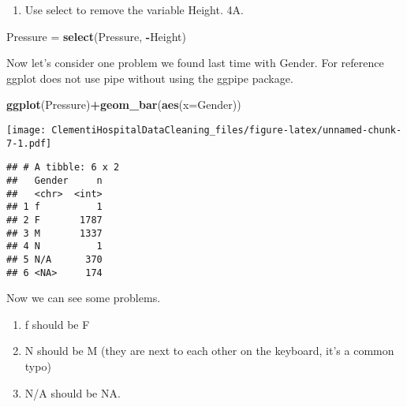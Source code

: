 \documentclass[
]{article}
\newenvironment{Shaded}{\begin{snugshade}}{\end{snugshade}}
\newcommand{\DataTypeTok}[1]{\textcolor[rgb]{0.13,0.29,0.53}{#1}}
\newcommand{\KeywordTok}[1]{\textcolor[rgb]{0.13,0.29,0.53}{\textbf{#1}}}
\newcommand{\NormalTok}[1]{#1}
\newcommand{\OperatorTok}[1]{\textcolor[rgb]{0.81,0.36,0.00}{\textbf{#1}}}
\newcommand{\StringTok}[1]{\textcolor[rgb]{0.31,0.60,0.02}{#1}}
\providecommand{\tightlist}{%
  \setlength{\itemsep}{0pt}\setlength{\parskip}{0pt}}
\begin{document}
\begin{enumerate}
\def\labelenumi{\arabic{enumi}.}
\setcounter{enumi}{3}
\tightlist
\item
  Use select to remove the variable Height. 4A.
\end{enumerate}

\begin{Shaded}
\begin{Highlighting}[]
\NormalTok{Pressure =}\StringTok{ }\KeywordTok{select}\NormalTok{(Pressure, }\OperatorTok{-}\NormalTok{Height)}
\end{Highlighting}
\end{Shaded}

Now let's consider one problem we found last time with Gender. For
reference ggplot does not use pipe without using the ggpipe package.

\begin{Shaded}
\begin{Highlighting}[]
\KeywordTok{ggplot}\NormalTok{(Pressure)}\OperatorTok{+}\KeywordTok{geom_bar}\NormalTok{(}\KeywordTok{aes}\NormalTok{(}\DataTypeTok{x=}\NormalTok{Gender))}
\end{Highlighting}
\end{Shaded}

\texttt{[image: ClementiHospitalDataCleaning\_files/figure-latex/unnamed-chunk-7-1.pdf]}

\begin{Shaded}
\end{Shaded}

\begin{verbatim}
## # A tibble: 6 x 2
##   Gender     n
##   <chr>  <int>
## 1 f          1
## 2 F       1787
## 3 M       1337
## 4 N          1
## 5 N/A      370
## 6 <NA>     174
\end{verbatim}

Now we can see some problems.

\begin{enumerate}
\def\labelenumi{\alph{enumi})}
\item
  f should be F
\item
  N should be M (they are next to each other on the keyboard, it's a
  common typo)
\item
  N/A should be NA.
\end{enumerate}
\end{document}
